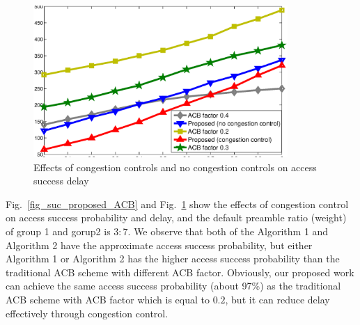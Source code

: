     \begin{figure}[t]
    \centering
    \includegraphics[width=3.8in]{combine_time.eps}
    \caption{Effects of congestion controls and no congestion controls on access success delay}
    \label{fig delay proposed ACB}
    \end{figure}
    Fig.~\ref{fig_suc_proposed_ACB} and Fig.~\ref{fig delay proposed ACB} show the effects of congestion control on access success probability and delay, and the default preamble ratio (weight) of group 1 and gorup2 is $3:7$. We observe that both of the Algorithm 1 and Algorithm 2 have the approximate access success probability, but either Algorithm 1 or Algorithm 2 has the higher access success probability than the traditional ACB scheme with different ACB factor. Obviously, our proposed work can achieve the same access success probability (about 97\%) as the traditional ACB scheme with ACB factor which is equal to $0.2$, but it can reduce delay effectively through congestion control.




